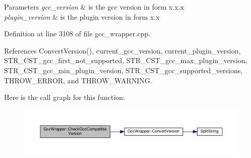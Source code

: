 \begin{DoxyParams}{Parameters}
{\em gcc\+\_\+version} & is the gcc version in form x.\+x.\+x \\
\hline
{\em plugin\+\_\+version} & is the plugin version in form x.\+x \\
\hline
\end{DoxyParams}


Definition at line 3108 of file gcc\+\_\+wrapper.\+cpp.



References Convert\+Version(), current\+\_\+gcc\+\_\+version, current\+\_\+plugin\+\_\+version, S\+T\+R\+\_\+\+C\+S\+T\+\_\+gcc\+\_\+first\+\_\+not\+\_\+supported, S\+T\+R\+\_\+\+C\+S\+T\+\_\+gcc\+\_\+max\+\_\+plugin\+\_\+version, S\+T\+R\+\_\+\+C\+S\+T\+\_\+gcc\+\_\+min\+\_\+plugin\+\_\+version, S\+T\+R\+\_\+\+C\+S\+T\+\_\+gcc\+\_\+supported\+\_\+versions, T\+H\+R\+O\+W\+\_\+\+E\+R\+R\+OR, and T\+H\+R\+O\+W\+\_\+\+W\+A\+R\+N\+I\+NG.

Here is the call graph for this function\+:
\nopagebreak
\begin{figure}[H]
\begin{center}
\leavevmode
\includegraphics[width=350pt]{d4/dbf/classGccWrapper_ac7ff70c47c923a35ae9820b32b2e9e44_cgraph}
\end{center}
\end{figure}
\mbox{\label{classGccWrapper_a22a070d6d7a5770090dc5a119e4fc0bc}} 
